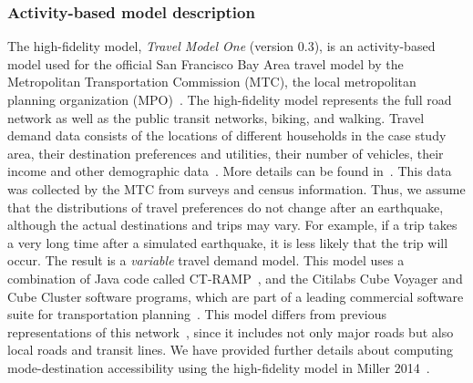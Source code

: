 \subsubsection{Activity-based model description}
The high-fidelity model, \emph{Travel Model One} (version 0.3), is an activity-based model used for the official San Francisco Bay Area travel model by the Metropolitan Transportation Commission (MTC), the local metropolitan planning organization (MPO)~\cite{erhardt_mtcs_2012}. The high-fidelity model represents the full road network as well as the public transit networks, biking, and walking. Travel demand data consists of the locations of different households in the case study area, their destination preferences and utilities, their number of vehicles, their income and other demographic data~\cite{erhardt_mtcs_2012,ory_personal_2013}. More details can be found in~\cite{waddell_urbansim:_2002}. This data was collected by the MTC from surveys and census information. Thus, we assume that the distributions of travel preferences do not change after an earthquake, although the actual destinations and trips may vary. For example, if a trip takes a very long time after a simulated earthquake, it is less likely that the trip will occur. The result is a \emph{variable} travel demand model. This model uses a combination of Java code called CT-RAMP~\cite{davidson_ct-ramp_2010}, and the Citilabs Cube Voyager and Cube Cluster software programs, which are part of a leading commercial software suite for transportation planning~\cite{citilabs_cube_2013,erhardt_mtcs_2012}. This model differs from previous representations of this network~\cite[e.g.,][]{basoz_risk_1996,jayaram_efficient_2010,wakabayashi_network_1992}, since it includes not only major roads but also local roads and transit lines. We have provided further details about computing mode-destination accessibility using the high-fidelity model in Miller 2014~\cite{miller_seismic_2014}.


